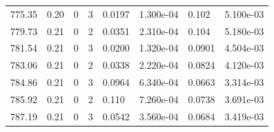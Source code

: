 \documentclass[preview]{standalone}
\begin{document}
{{{{{{{{{{{\begin{tabular}{L{1.2cm}C{1.2cm} C{0.3cm}C{0.5cm} C{1.4cm}C{1.4cm} C{1.4cm}C{1.4cm}}
  775.35  &  0.20  & 0     &  3 &  0.0197  & 1.300e-04  & 0.102 &  5.100e-03   \\ 
  779.73  &  0.21  & 0     &  2 &  0.0351  & 2.310e-04  & 0.104 &  5.180e-03   \\ 
  781.54  &  0.21  & 0     &  3 &  0.0200  & 1.320e-04  & 0.0901 &  4.504e-03   \\ 
  783.06  &  0.21  & 0     &  2 &  0.0338  & 2.220e-04  & 0.0824 &  4.120e-03   \\ 
  784.86  &  0.21  & 0     &  3 &  0.0964  & 6.340e-04  & 0.0663 &  3.314e-03   \\ 
  785.92  &  0.21  & 0     &  2 &  0.110  & 7.260e-04  & 0.0738 &  3.691e-03   \\ 
  787.19  &  0.21  & 0     &  3 &  0.0542  & 3.560e-04  & 0.0684 &  3.419e-03   \\ 
\hline 
\end{tabular} 

}}}}}}}}}}}
\end{document}
